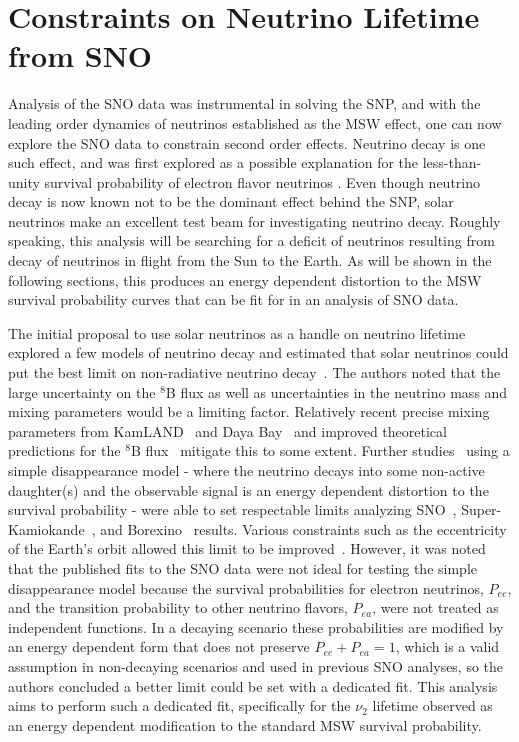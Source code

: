 \chapter{Constraints on Neutrino Lifetime from SNO}
\label{ch:lifetime}

Analysis of the SNO data was instrumental in solving the SNP, and with the leading order dynamics of neutrinos established as the MSW effect, one can now explore the SNO data to constrain second order effects. 
Neutrino decay is one such effect, and was first explored as a possible explanation for the less-than-unity survival probability of electron flavor neutrinos \cite{bachall_stable}.
Even though neutrino decay is now known not to be the dominant effect behind the SNP, solar neutrinos make an excellent test beam for investigating neutrino decay.
Roughly speaking, this analysis will be searching for a deficit of neutrinos resulting from decay of neutrinos in flight from the Sun to the Earth.
As will be shown in the following sections, this produces an energy dependent distortion to the MSW survival probability curves that can be fit for in an analysis of SNO data.

The initial proposal to use solar neutrinos as a handle on neutrino lifetime explored a few models of neutrino decay and estimated that solar neutrinos could put the best limit on non-radiative neutrino decay~\cite{beacombell}.
The authors noted that the large uncertainty on the $^8$B flux as well as uncertainties in the neutrino mass and mixing parameters would be a limiting factor.
Relatively recent precise mixing parameters from KamLAND~\cite{kamland} and Daya Bay~\cite{dayabay} and improved theoretical predictions for the $^8$B flux~\cite{serenelli} mitigate this to some extent.
Further studies~\cite{berryman} using a simple disappearance model - where the neutrino decays into some non-active daughter(s) and the observable signal is an energy dependent distortion to the survival probability - were able to set respectable limits analyzing SNO~\cite{sno}, Super-Kamiokande~\cite{superk}, and Borexino~\cite{borexino} results.
Various constraints such as the eccentricity of the Earth's orbit allowed this limit to be improved~\cite{picoreti}. 
However, it was noted~\cite{berryman} that the published fits to the SNO data were not ideal for testing the simple disappearance model because the survival probabilities for electron neutrinos, $P_{ee}$, and the transition probability to other neutrino flavors, $P_{ea}$, were not treated as independent functions.
In a decaying scenario these probabilities are modified by an energy dependent form that does not preserve $P_{ee} + P_{ea} = 1$, which is a valid assumption in non-decaying scenarios and used in previous SNO analyses, so the authors concluded a better limit could be set with a dedicated fit.
This analysis aims to perform such a dedicated fit, specifically for the $\nu_2$ lifetime observed as an energy dependent modification to the standard MSW survival probability.

